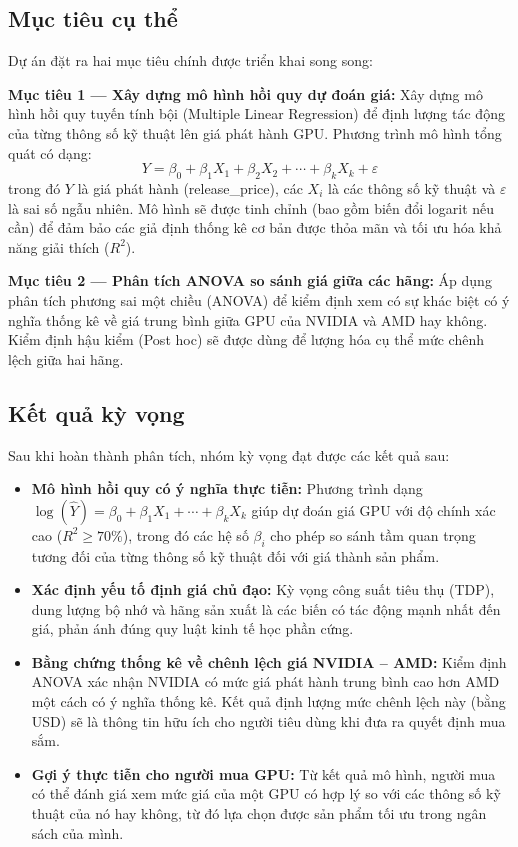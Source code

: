\documentclass[a4paper]{article}
\begin{document}
\subsection{Mục tiêu cụ thể}

Dự án đặt ra hai mục tiêu chính được triển khai song song:

\textbf{Mục tiêu 1 — Xây dựng mô hình hồi quy dự đoán giá:} Xây dựng mô hình hồi quy tuyến tính bội (Multiple Linear Regression) để định lượng tác động của từng thông số kỹ thuật lên giá phát hành GPU. Phương trình mô hình tổng quát có dạng:
\[
Y = \beta_0 + \beta_1 X_1 + \beta_2 X_2 + \cdots + \beta_k X_k + \varepsilon
\]
trong đó $Y$ là giá phát hành (release\_price), các $X_i$ là các thông số kỹ thuật và $\varepsilon$ là sai số ngẫu nhiên. Mô hình sẽ được tinh chỉnh (bao gồm biến đổi logarit nếu cần) để đảm bảo các giả định thống kê cơ bản được thỏa mãn và tối ưu hóa khả năng giải thích ($R^2$).

\textbf{Mục tiêu 2 — Phân tích ANOVA so sánh giá giữa các hãng:} Áp dụng phân tích phương sai một chiều (ANOVA) để kiểm định xem có sự khác biệt có ý nghĩa thống kê về giá trung bình giữa GPU của NVIDIA và AMD hay không. Kiểm định hậu kiểm (Post hoc) sẽ được dùng để lượng hóa cụ thể mức chênh lệch giữa hai hãng.

\subsection{Kết quả kỳ vọng}

Sau khi hoàn thành phân tích, nhóm kỳ vọng đạt được các kết quả sau:

\begin{itemize}
    \item \textbf{Mô hình hồi quy có ý nghĩa thực tiễn:} Phương trình dạng $\log(\hat{Y}) = \beta_0 + \beta_1 X_1 + \cdots + \beta_k X_k$ giúp dự đoán giá GPU với độ chính xác cao ($R^2 \geq 70\%$), trong đó các hệ số $\beta_i$ cho phép so sánh tầm quan trọng tương đối của từng thông số kỹ thuật đối với giá thành sản phẩm.

    \item \textbf{Xác định yếu tố định giá chủ đạo:} Kỳ vọng công suất tiêu thụ (TDP), dung lượng bộ nhớ và hãng sản xuất là các biến có tác động mạnh nhất đến giá, phản ánh đúng quy luật kinh tế học phần cứng.

    \item \textbf{Bằng chứng thống kê về chênh lệch giá NVIDIA -- AMD:} Kiểm định ANOVA xác nhận NVIDIA có mức giá phát hành trung bình cao hơn AMD một cách có ý nghĩa thống kê. Kết quả định lượng mức chênh lệch này (bằng USD) sẽ là thông tin hữu ích cho người tiêu dùng khi đưa ra quyết định mua sắm.

    \item \textbf{Gợi ý thực tiễn cho người mua GPU:} Từ kết quả mô hình, người mua có thể đánh giá xem mức giá của một GPU có hợp lý so với các thông số kỹ thuật của nó hay không, từ đó lựa chọn được sản phẩm tối ưu trong ngân sách của mình.
\end{itemize}
\end{document}
